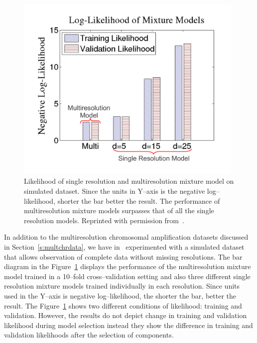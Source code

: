 \begin{figure}[h!]
\centering
\includegraphics[trim=12mm 10mm 10mm 5mm,width=0.98\textwidth]{figures/barlkhood}
\caption[Comparison of Performance of the Mixture Models.]
{Likelihood of single resolution and multiresolution 
mixture model on simulated dataset. Since the units in 
Y--axis is the negative log--likelihood, shorter the bar 
better the result. The performance of multiresolution 
mixture models surpasses that of all the single resolution
models. Reprinted with permission from~.} 
\label{Fig:barmultires}
\end{figure}

In addition to the multiresolution chromosomal amplification 
datasets discussed in Section~\ref{s:multchrdata}, we 
have in~ experimented with a simulated 
dataset that allows observation of complete data
without missing resolutions. 
The bar diagram in the Figure~\ref{Fig:barmultires} 
displays the performance of the multiresolution 
mixture model trained in a 10--fold cross--validation 
setting and also three different single resolution 
mixture models trained individually in each resolution. 
Since units used in the Y--axis is negative log--likelihood, 
the shorter the bar, better the result. The 
Figure~\ref{Fig:barmultires} shows two different conditions 
of likelihood: training  and validation. However,  
the results do not depict change in training 
and validation likelihood during model selection instead  
they  show the difference in training and validation 
likelihoods after the selection of components. 

